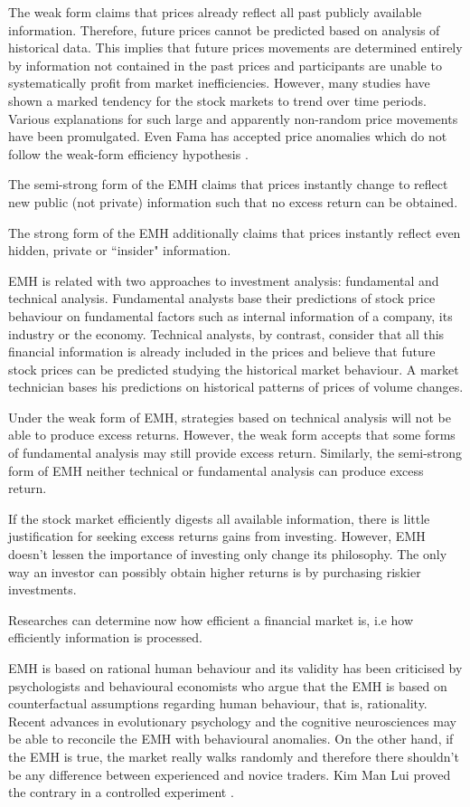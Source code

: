 The weak form claims that prices already reflect all past publicly available
information. Therefore, future prices cannot be predicted based on analysis of
historical data. This implies that future prices movements are determined
entirely by information not contained in the past prices and participants are
unable to systematically profit from market inefficiencies.  However, many
studies have shown a marked tendency for the stock markets to trend over time
periods. Various explanations for such large and apparently non-random price
movements have been promulgated. Even Fama has accepted price anomalies which
do not follow the weak-form efficiency hypothesis \cite{fama+french2008}.

The semi-strong form of the EMH claims that prices instantly change to reflect
new public (not private) information such that no excess return can be
obtained. 

The strong form of the EMH additionally claims that prices instantly reflect
even hidden, private or ``insider" information. 

EMH is related with two approaches to investment analysis: fundamental and
technical analysis. Fundamental analysts base their predictions of stock price
behaviour on fundamental factors such as internal information of a company, its
industry or the economy. Technical analysts, by contrast, consider that all
this financial information is already included in the prices and believe that
future stock prices can be predicted studying the historical market behaviour.
A market technician bases his predictions on historical patterns of prices of
volume changes.

Under the weak form of EMH, strategies based on technical analysis will not be
able to produce excess returns. However, the weak form accepts that some forms
of fundamental analysis may still provide excess return. Similarly, the
semi-strong form of EMH  neither technical or fundamental analysis can produce
excess return.

If the stock market efficiently digests all available information, there is
little justification for seeking excess returns gains from investing. However,
EMH doesn't lessen the importance of investing only change its philosophy. The
only way an investor can possibly obtain higher returns is by purchasing
riskier investments.

 Researches can determine now how efficient a financial market is, i.e how
efficiently information is processed.  

EMH is based on rational human behaviour and its validity has been criticised
by psychologists and behavioural economists who argue that the EMH is based on
counterfactual assumptions regarding human behaviour, that is, rationality.
Recent advances in evolutionary psychology and the cognitive neurosciences may
be able to reconcile the EMH with behavioural anomalies. On the other hand, if
the EMH is true, the market really walks randomly and therefore there shouldn't
be any difference between experienced and novice traders. Kim Man Lui proved
the contrary in a controlled experiment \cite{man2013}.

